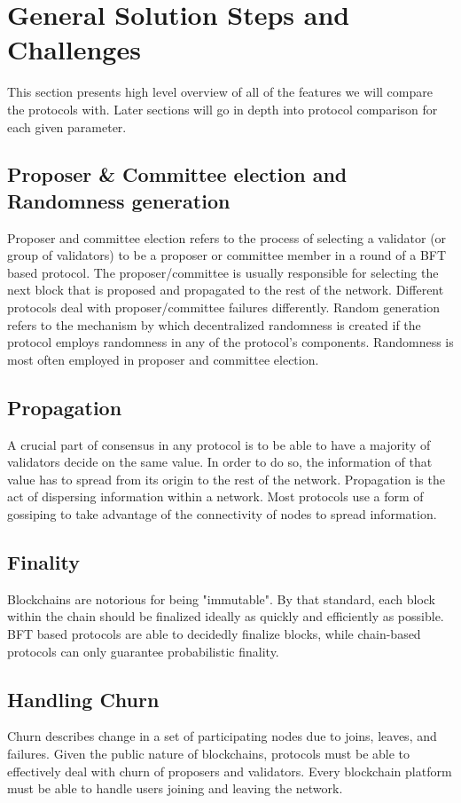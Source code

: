 \documentclass[10pt,journal,compsoc]{IEEEtran}
\begin{document}
\section{General Solution Steps and Challenges}
This section presents high level overview of all of the features we will compare the protocols with. Later sections will go in depth into protocol comparison for each given parameter.

\subsection{Proposer \& Committee election and Randomness generation}
Proposer and committee election refers to the process of selecting a validator (or group of validators) to be a proposer or committee member in a round of a BFT based protocol. The proposer/committee is usually responsible for selecting the next block that is proposed and propagated to the rest of the network. Different protocols deal with proposer/committee failures differently. Random generation refers to the mechanism by which decentralized randomness is created if the protocol employs randomness in any of the protocol's components. Randomness is most often employed in proposer and committee election.
 
\subsection{Propagation}
A crucial part of consensus in any protocol is to be able to have a majority of validators decide on the same value. In order to do so, the information of that value has to spread from its origin to the rest of the network. Propagation is the act of dispersing information within a network. Most protocols use a form of gossiping to take advantage of the connectivity of nodes to spread information.

\subsection{Finality}
Blockchains are notorious for being "immutable". By that standard, each block within the chain should be finalized ideally as quickly and efficiently as possible. BFT based protocols are able to decidedly finalize blocks, while chain-based protocols can only guarantee probabilistic finality.

\subsection{Handling Churn}
Churn describes change in a set of participating nodes due to joins, leaves, and failures. \cite{GodfreyEtAl} Given the public nature of blockchains, protocols must be able to effectively deal with churn of proposers and validators. Every blockchain platform must be able to handle users joining and leaving the network.
\end{document}
